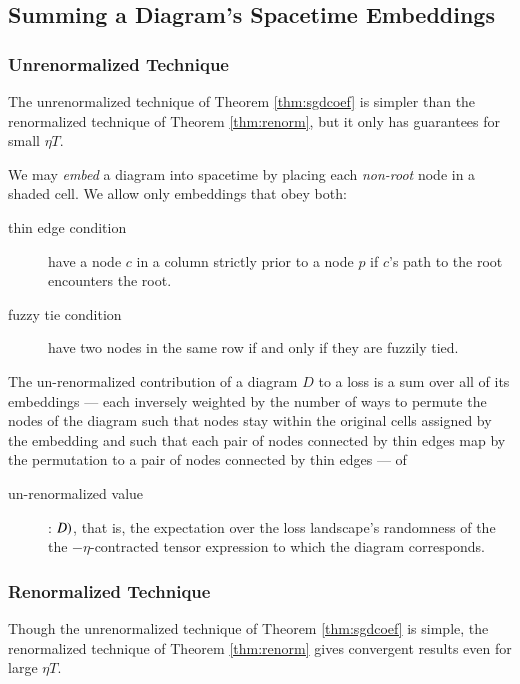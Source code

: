 \documentclass{article}
\theoremstyle{plain}
\theoremstyle{definition}
\begin{document}
    \subsection{Summing a Diagram's Spacetime Embeddings}
        \subsubsection*{Unrenormalized Technique} 
            The unrenormalized technique of Theorem \ref{thm:sgdcoef} is
            simpler than the renormalized technique of Theorem
            \ref{thm:renorm}, but it only has guarantees for small $\eta T$.

            We may \emph{embed} a diagram into spacetime by placing each
            \emph{non-root} node in a shaded cell.  We allow only embeddings
            that obey both:
            \begin{description}
                \item[thin edge condition] have a node $c$ in a column strictly
                    prior to a node $p$ if $c$'s path to the root encounters
                    the root.
                \item[fuzzy tie condition] have two nodes in the same row if
                    and only if they are fuzzily tied.
            \end{description}

            The un-renormalized contribution of a diagram $D$ to a loss is a
            sum over all of its embeddings --- each inversely weighted by the
            number of ways to permute the nodes of the diagram such that nodes
            stay within the original cells assigned by the embedding and such
            that each pair of nodes connected by thin edges map by the
            permutation to a pair of nodes connected by thin edges --- of
            \begin{description}
                \item[un-renormalized value]: $\value(D)$, that is, the
                    expectation over the loss landscape's randomness of the
                    the $-\eta$-contracted tensor expression to which the
                    diagram corresponds.
            \end{description}

        \subsubsection*{Renormalized Technique} 
            Though the unrenormalized technique of Theorem \ref{thm:sgdcoef} is
            simple, the renormalized technique of Theorem \ref{thm:renorm}
            gives convergent results even for large $\eta T$.
\end{document}
